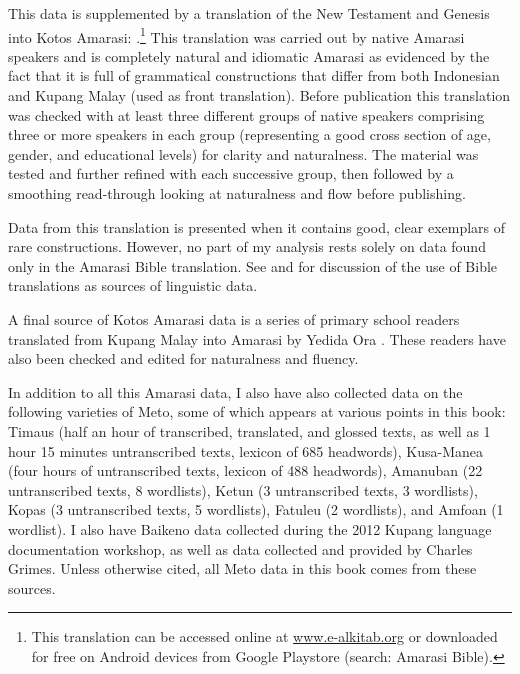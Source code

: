 This data is supplemented by a translation
of the New Testament and Genesis into Kotos Amarasi: \citet{UBB15}.\footnote{
		This translation can be accessed online at \url{www.e-alkitab.org}
		or downloaded for free on Android devices from Google Playstore (search: Amarasi Bible).}
This translation was carried out by native Amarasi speakers
and is completely natural and idiomatic Amarasi as evidenced
by the fact that it is full of grammatical constructions that differ
from both Indonesian and Kupang Malay (used as front translation).
Before publication this translation was checked with at least three different
groups of native speakers comprising three or more speakers in each group
(representing a good cross section of age, gender, and educational levels) for clarity and naturalness.
The material was tested and further refined with each successive group,
then followed by a smoothing read-through looking at naturalness and flow before publishing.

Data from this translation is presented
when it contains good, clear exemplars of rare constructions.
However, no part of my analysis rests
solely on data found only in the Amarasi Bible translation.
See \cite{hehawi11} and \citet[2]{dryer13} for discussion of
the use of Bible translations as sources of linguistic data.

A final source of Kotos Amarasi data is a series
of primary school readers translated from Kupang Malay
into Amarasi by Yedida Ora \citep{or16,or16b,or16c}.
These readers have also been checked and edited for naturalness and fluency.

In addition to all this Amarasi data, I also have also
collected data on the following varieties of Meto,
some of which appears at various points in this book:
Timaus (half an hour of transcribed, translated, and glossed texts,
as well as 1 hour 15 minutes untranscribed texts, lexicon of 685 headwords),
Kusa-Manea (four hours of untranscribed texts, lexicon of 488 headwords),
Amanuban (22 untranscribed texts, 8 wordlists),
Ketun (3 untranscribed texts, 3 wordlists),
Kopas (3 untranscribed texts, 5 wordlists),
Fatule{\Q}u (2 wordlists), and
Amfo{\Q}an (1 wordlist).
I also have Baikeno data collected during
the 2012 Kupang language documentation workshop,
as well as data collected and provided by Charles Grimes.
Unless otherwise cited, all Meto data in this book comes
from these sources.